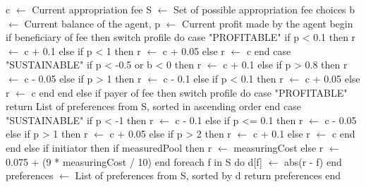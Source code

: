 
\begin{pseudocode}[label=alg:appfeevote,caption={Appropriation fee voting algorithm.}]
c $\leftarrow$ Current appropriation fee
S $\leftarrow$ Set of possible appropriation fee choices
b $\leftarrow$ Current balance of the agent,
p $\leftarrow$ Current profit made by the agent
begin
	if beneficiary of fee then
		switch profile do
			case "PROFITABLE"
				if p < 0.1 then r $\leftarrow$ c + 0.1
				else if p < 1 then r $\leftarrow$ c + 0.05
				else r $\leftarrow$ c
			end
			case "SUSTAINABLE"
				if p < -0.5 or b < 0 then r $\leftarrow$ c + 0.1
				else if p > 0.8 then r $\leftarrow$ c - 0.05
				else if p > 1 then r $\leftarrow$ c - 0.1
				else if p < 0.1 then r $\leftarrow$ c + 0.05
				else r $\leftarrow$ c
			end
		end
	else if payer of fee then
		switch profile do
			case "PROFITABLE"
				return List of preferences from S, sorted in ascending order
			end
			case "SUSTAINABLE"
				if p < -1 then r $\leftarrow$ c - 0.1
				else if p <= 0.1 then r $\leftarrow$ c - 0.05
				else if p > 1 then r $\leftarrow$ c + 0.05
				else if p > 2 then r $\leftarrow$ c + 0.1
				else r $\leftarrow$ c
			end
		end
	else if initiator then
		if measuredPool then r $\leftarrow$ measuringCost
		else r $\leftarrow$ 0.075 + (9 * measuringCost / 10)
	end
	foreach f in S do
		d[f] $\leftarrow$ abs(r - f)
	end
	preferences $\leftarrow$ List of preferences from S, sorted by d
	return preferences
end
\end{pseudocode}

